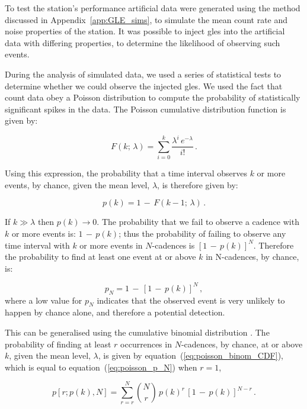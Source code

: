To test the station's performance artificial data were generated using the method discussed in Appendix~\ref{app:GLE_sims}, to simulate the mean count rate and noise properties of the station. It was possible to inject \glspl{gle} into the artificial data with differing properties, to determine the likelihood of observing such events.

During the analysis of simulated data, we used a series of statistical tests to determine whether we could observe the injected \glspl{gle}. We used the fact that count data obey a Poisson distribution to compute the probability of statistically significant spikes in the data. The Poisson cumulative distribution function is given by:

\begin{equation}
F(k; \, \lambda) = \sum_{i=0}^{k}  \frac{\lambda^i \, e^{-\lambda}}{i!} \, .
\label{eq:poisson_CDF}
\end{equation}


Using this expression, the probability that a time interval observes $k$ or more events, by chance, given the mean level, $\lambda$, is therefore given by: 

\begin{equation}
p(k) = 1 \, - \, F(k-1; \, \lambda) \, .
\label{eq:poisson_SF}
\end{equation}

If $k\gg\lambda$ then $p(k)\to0$. The probability that we fail to observe a cadence with $k$ or more events is: $1 \, - \, p(k)$; thus the probability of failing to observe any time interval with $k$ or more events in $N$-cadences is $[1 \, - \, p(k)]^N$. Therefore the probability to find at least one event at or above $k$ in N-cadences, by chance, is:

\begin{equation}
p_N = 1\, - \, [1 \, - \, p(k)]^N \, ,
\label{eq:poisson_p_N}
\end{equation}
%
where a low value for $p_N$ indicates that the observed event is very unlikely to happen by chance alone, and therefore a potential detection.

This can be generalised using the cumulative binomial distribution \citep{basu_asteroseismic_2017}. The probability of finding at least $r$ occurrences in $N$-cadences, by chance, at or above $k$, given the mean level, $\lambda$, is given by equation~(\ref{eq:poisson_binom_CDF}), which is equal to equation~(\ref{eq:poisson_p_N}) when $r=1$,

\begin{equation}
p[r; p(k), N] = \sum_{r=r}^{N} \binom{N}{r} \, p(k)^r \, [1 \, - \, p(k)]^{N-r} \, .
\label{eq:poisson_binom_CDF}
\end{equation}

